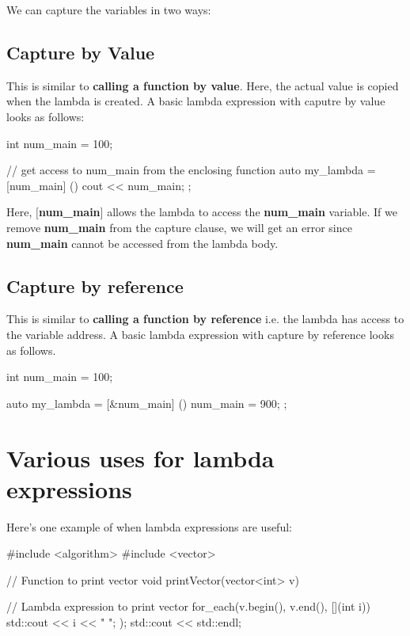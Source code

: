 \documentclass{report}
\begin{document}
\noindent We can capture the variables in two ways:
\subsection*{Capture by Value}
This is similar to \textbf{calling a function by value}. Here, the actual value is copied when the lambda is created.
\bigbreak \bigbreak \noindent A basic lambda expression with caputre by value looks as follows:
\begin{cppcode}
 int num_main = 100; 

 // get access to num_main from the enclosing function
 auto my_lambda = [num_main] () {
   cout << num_main;
 };
\end{cppcode}
\bigbreak \noindent
\bigbreak \noindent
Here, \textbf{$[$num\_main$]$} allows the lambda to access the \textbf{num\_main} variable.
\bigbreak \noindent
If we remove \textbf{num\_main} from the capture clause, we will get an error since \textbf{num\_main} cannot be accessed from the lambda body.
\subsection*{Capture by reference}
This is similar to \textbf{calling a function by reference} i.e. the lambda has access to the variable address.
\bigbreak \noindent
A basic lambda expression with capture by reference looks as follows.
\begin{cppcode}
 int num_main = 100; 

 auto my_lambda = [&num_main] () {
    num_main = 900;
 };
\end{cppcode}
\section{Various uses for lambda expressions}
Here's one example of when lambda expressions are useful:
\begin{cppcode}
  #include <algorithm>
  #include <vector>

  // Function to print vector
  void printVector(vector<int> v) {

    // Lambda expression to print vector
    for_each(v.begin(), v.end(), [](int i)) 
    {
      std::cout << i << " ";
    });
    std::cout << std::endl;
  }
\end{cppcode}
\end{document}
